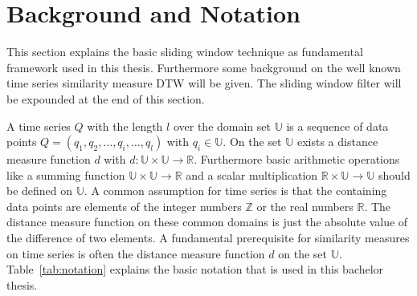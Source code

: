 \section{Background and Notation} \label{background_and_notation}
This section explains the basic sliding window technique as fundamental framework used in this thesis. Furthermore some
background on the well known time series similarity measure DTW will be given. The sliding window filter will be
expounded at the end of this section.

A time series $Q$ with the length $l$ over the domain set $\mathbb{U}$ is a sequence of data points
$Q = (q_1, q_2, \dots, q_i, \dots, q_l)$ with $q_i \in \mathbb{U}$. On the set $\mathbb{U}$ exists a distance measure
function $d$ with $d: \mathbb{U} \times \mathbb{U} \to \mathbb{R}$. Furthermore basic arithmetic operations like a
summing function $\mathbb{U} \times \mathbb{U} \to \mathbb{R}$ and a scalar multiplication
$\mathbb{R} \times \mathbb{U} \to \mathbb{U}$ should be defined on $\mathbb{U}$. A common assumption for time series is
that the containing data points are elements of the integer numbers $\mathbb{Z}$ or the real numbers $\mathbb{R}$. The
distance measure function on these common domains is just the absolute value of the difference of two elements. A
fundamental prerequisite for similarity measures on time series is often the distance measure function $d$ on the set
$\mathbb{U}$. Table~\ref{tab:notation} explains the basic notation that is used in this bachelor thesis.

